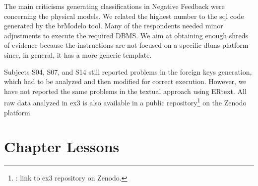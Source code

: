 The main criticisms generating classifications in Negative Feedback were concerning the physical models.
We related the highest number to the \ac{sql} code generated by the brModelo tool. Many of the respondents needed minor adjustments to execute the required DBMS.
We aim at obtaining enough shreds of evidence because the instructions are not focused on a specific \ac{dbms} platform since, in general, it has a more generic template.

Subjects S04, S07, and S14 still reported problems in the foreign keys generation, which had to be analyzed and then modified for correct execution.
However, we have not reported the same problems in the textual approach using ERtext.
All raw data analyzed in \ac{ex3} is also available in a public repository\footnote{: link to ex3 repository on Zenodo.} on the Zenodo platform.

\section{Chapter Lessons}
\label{sec_experiments:lessons}

